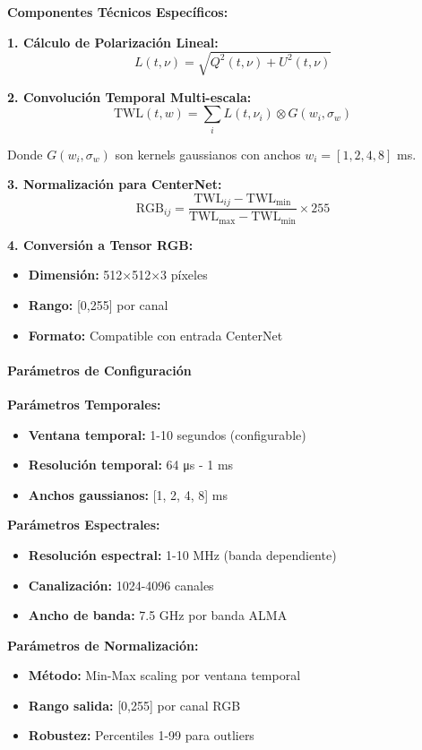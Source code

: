 \textbf{Componentes Técnicos Específicos:}

\textbf{1. Cálculo de Polarización Lineal:}
\[
L(t,\nu) = \sqrt{Q^2(t,\nu) + U^2(t,\nu)}
\]

\textbf{2. Convolución Temporal Multi-escala:}
\[
\text{TWL}(t,w) = \sum_{i} L(t,\nu_i) \otimes G(w_i, \sigma_w)
\]

Donde $G(w_i, \sigma_w)$ son kernels gaussianos con anchos $w_i = [1,2,4,8]$ ms.

\textbf{3. Normalización para CenterNet:}
\[
\text{RGB}_{ij} = \frac{\text{TWL}_{ij} - \text{TWL}_{\min}}{\text{TWL}_{\max} - \text{TWL}_{\min}} \times 255
\]

\textbf{4. Conversión a Tensor RGB:}
\begin{itemize}
\item \textbf{Dimensión:} 512×512×3 píxeles
\item \textbf{Rango:} [0,255] por canal
\item \textbf{Formato:} Compatible con entrada CenterNet
\end{itemize}

\paragraph{Parámetros de Configuración}

\textbf{Parámetros Temporales:}
\begin{itemize}
\item \textbf{Ventana temporal:} 1-10 segundos (configurable)
\item \textbf{Resolución temporal:} 64 μs - 1 ms
\item \textbf{Anchos gaussianos:} [1, 2, 4, 8] ms
\end{itemize}

\textbf{Parámetros Espectrales:}
\begin{itemize}
\item \textbf{Resolución espectral:} 1-10 MHz (banda dependiente)
\item \textbf{Canalización:} 1024-4096 canales
\item \textbf{Ancho de banda:} 7.5 GHz por banda ALMA
\end{itemize}

\textbf{Parámetros de Normalización:}
\begin{itemize}
\item \textbf{Método:} Min-Max scaling por ventana temporal
\item \textbf{Rango salida:} [0,255] por canal RGB
\item \textbf{Robustez:} Percentiles 1-99 para outliers
\end{itemize}

